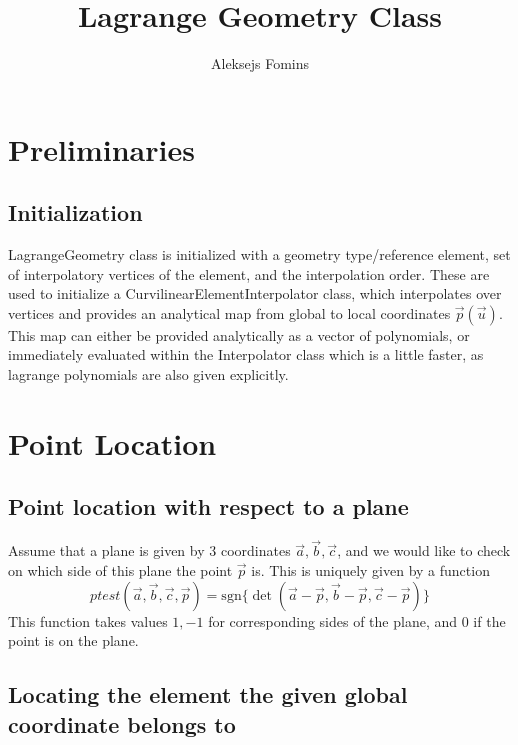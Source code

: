 \documentclass[12pt]{article}
\title{Lagrange Geometry Class}
\author{Aleksejs Fomins}
\date{}
\begin{document}
 


\maketitle 

\section{Preliminaries}

\subsection{Initialization}

LagrangeGeometry class is initialized with a geometry type/reference element, set of interpolatory vertices of the element, and the interpolation order. These are used to initialize a CurvilinearElementInterpolator class, which interpolates over vertices and provides an analytical map from global to local coordinates $\vec{p}(\vec{u})$. This map can either be provided analytically as a vector of polynomials, or immediately evaluated within the Interpolator class which is a little faster, as lagrange polynomials are also given explicitly.

\section{Point Location}

\subsection{Point location with respect to a plane}

Assume that a plane is given by 3 coordinates $\vec{a}, \vec{b}, \vec{c}$, and we would like to check on which side of this plane the point $\vec{p}$ is. This is uniquely given by a function
\begin{equation}
\label{equation-point-plane-test}
	ptest(\vec{a}, \vec{b}, \vec{c}, \vec{p}) = \mathrm{sgn} \{ \det (\vec{a} - \vec{p}, \vec{b} - \vec{p}, \vec{c} - \vec{p}) \}
\end{equation}
\noindent
This function takes values $1,-1$ for corresponding sides of the plane, and $0$ if the point is on the plane.

\subsection{Locating the element the given global coordinate belongs to}
\label{subsection-locating-element}
\end{document}
